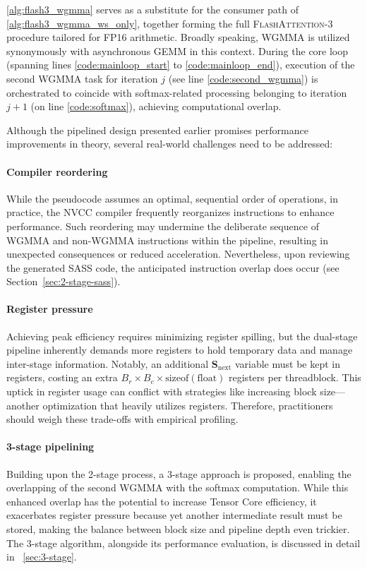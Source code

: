 \begin{algorithm}[H]
\begin{algorithmic}[1]
\cref{alg:flash3_wgmma} serves as a substitute for the consumer path of \cref{alg:flash3_wgmma_ws_only}, together forming the full \textsc{FlashAttention-3} procedure tailored for FP16 arithmetic. Broadly speaking, WGMMA is utilized synonymously with asynchronous GEMM in this context. During the core loop (spanning lines \ref{code:mainloop_start} to \ref{code:mainloop_end}), execution of the second WGMMA task for iteration $j$ (see line \ref{code:second_wgmma}) is orchestrated to coincide with softmax-related processing belonging to iteration $j+1$ (on line \ref{code:softmax}), achieving computational overlap.

Although the pipelined design presented earlier promises performance improvements in theory, several real-world challenges need to be addressed:

\paragraph{Compiler reordering} While the pseudocode assumes an optimal, sequential order of operations, in practice, the NVCC compiler frequently reorganizes instructions to enhance performance. Such reordering may undermine the deliberate sequence of WGMMA and non-WGMMA instructions within the pipeline, resulting in unexpected consequences or reduced acceleration. Nevertheless, upon reviewing the generated SASS code, the anticipated instruction overlap does occur (see Section~\ref{sec:2-stage-sass}).

\paragraph{Register pressure} Achieving peak efficiency requires minimizing register spilling, but the dual-stage pipeline inherently demands more registers to hold temporary data and manage inter-stage information. Notably, an additional $\mathbf{S}_{\mathrm{next}}$ variable must be kept in registers, costing an extra $B_r \times B_c \times \text{sizeof}(\text{float})$ registers per threadblock. This uptick in register usage can conflict with strategies like increasing block size—another optimization that heavily utilizes registers. Therefore, practitioners should weigh these trade-offs with empirical profiling.

\paragraph{3-stage pipelining} Building upon the 2-stage process, a 3-stage approach is proposed, enabling the overlapping of the second WGMMA with the softmax computation. While this enhanced overlap has the potential to increase Tensor Core efficiency, it exacerbates register pressure because yet another intermediate result must be stored, making the balance between block size and pipeline depth even trickier. The 3-stage algorithm, alongside its performance evaluation, is discussed in detail in ~\cref{sec:3-stage}.


\end{algorithmic}
\end{algorithm}
